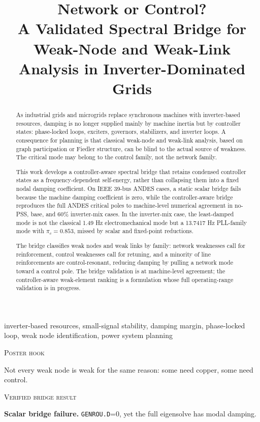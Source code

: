 \documentclass[conference]{IEEEtran}
\title{\LARGE Network or Control?\\
A Validated Spectral Bridge for Weak-Node and Weak-Link Analysis in Inverter-Dominated Grids}
\author{\IEEEauthorblockN{Jorge L. Mayorga Taborda}
\IEEEauthorblockA{Universidad de los Andes\\
Bogot\'a, Colombia}}
\newcommand{\blocktitle}[1]{%
  \vspace{0.42em}%
  \noindent\centerline{\scshape #1}%
  \vspace{0.16em}%
}
\begin{document}
\maketitle
\vspace{-1.15em}

\begin{abstract}
As industrial grids and microgrids replace synchronous machines with inverter-based resources, damping is no longer supplied mainly by machine inertia but by controller states: phase-locked loops, exciters, governors, stabilizers, and inverter loops. A consequence for planning is that classical weak-node and weak-link analysis, based on graph participation or Fiedler structure, can be blind to the actual source of weakness. The critical mode may belong to the control family, not the network family.

This work develops a controller-aware spectral bridge that retains condensed controller states as a frequency-dependent self-energy, rather than collapsing them into a fixed nodal damping coefficient. On IEEE 39-bus ANDES cases, a static scalar bridge fails because the machine damping coefficient is zero, while the controller-aware bridge reproduces the full ANDES critical poles to machine-level numerical agreement in no-PSS, base, and 60\% inverter-mix cases. In the inverter-mix case, the least-damped mode is not the classical 1.49 Hz electromechanical mode but a 13.7417 Hz PLL-family mode with \(\pi_c=0.853\), missed by scalar and fixed-point reductions.

The bridge classifies weak nodes and weak links by family: network weaknesses call for reinforcement, control weaknesses call for retuning, and a minority of line reinforcements are control-resonant, reducing damping by pulling a network mode toward a control pole. The bridge validation is at machine-level agreement; the controller-aware weak-element ranking is a formulation whose full operating-range validation is in progress.
\end{abstract}

\begin{IEEEkeywords}
inverter-based resources, small-signal stability, damping margin, phase-locked loop, weak node identification, power system planning
\end{IEEEkeywords}

\blocktitle{Poster hook}
Not every weak node is weak for the same reason: some need copper, some need control.

\blocktitle{Verified bridge result}
\noindent\textbf{Scalar bridge failure.} \texttt{GENROU.D}=0, yet the full eigensolve has modal damping.
\end{document}
